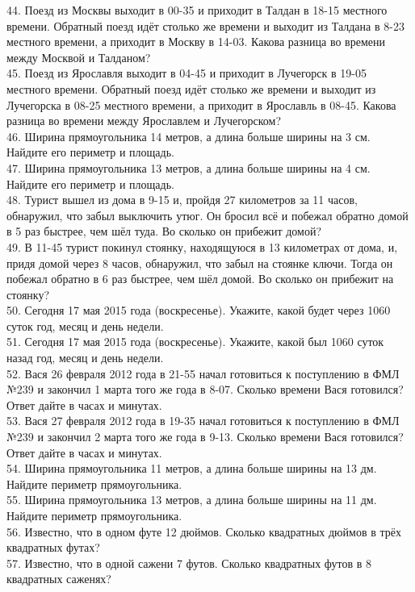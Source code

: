 \documentclass[12pt]{article}
\begin{document}
44. Поезд из Москвы выходит в 00-35 и приходит в Талдан в 18-15 местного времени. Обратный поезд идёт столько же времени и выходит из Талдана в 8-23 местного времени, а приходит в Москву в 14-03. Какова разница во времени между Москвой и Талданом?\\
45. Поезд из Ярославля выходит в 04-45 и приходит в Лучегорск в 19-05 местного времени. Обратный поезд идёт столько же времени и выходит из Лучегорска в 08-25 местного времени, а приходит в Ярославль в 08-45. Какова разница во времени между Ярославлем и Лучегорском?\\
46. Ширина прямоугольника 14 метров, а длина больше ширины на 3 см. Найдите его периметр и площадь.\\
47. Ширина прямоугольника 13 метров, а длина больше ширины на 4 см. Найдите его периметр и площадь.\\
48. Турист вышел из дома в 9-15 и, пройдя 27 километров за 11 часов, обнаружил, что забыл выключить утюг. Он бросил всё и побежал обратно домой в 5 раз быстрее, чем шёл туда. Во сколько он прибежит домой?\\
49. В 11-45 турист покинул стоянку, находящуюся в 13 километрах от дома, и, придя домой через 8 часов, обнаружил, что забыл на стоянке ключи. Тогда он побежал обратно в 6 раз быстрее, чем шёл домой. Во сколько он прибежит на стоянку?\\
50. Сегодня 17 мая 2015 года (воскресенье). Укажите, какой будет через 1060 суток год, месяц и день недели.\\
51. Сегодня 17 мая 2015 года (воскресенье). Укажите, какой был 1060 суток назад год, месяц и день недели.\\
52. Вася 26 февраля 2012 года в 21-55 начал готовиться к поступлению в ФМЛ №239 и закончил 1 марта того же года в 8-07. Сколько времени Вася готовился? Ответ дайте в часах и минутах.\\
53. Вася 27 февраля 2012 года в 19-35 начал готовиться к поступлению в ФМЛ №239 и закончил 2 марта того же года в 9-13. Сколько времени Вася готовился? Ответ дайте в часах и минутах.\\
54. Ширина прямоугольника 11 метров, а длина больше ширины на 13 дм. Найдите периметр прямоугольника.\\
55. Ширина прямоугольника 13 метров, а длина больше ширины на 11 дм. Найдите периметр прямоугольника.\\
56. Известно, что в одном футе 12 дюймов. Сколько квадратных дюймов в трёх квадратных футах?\\
57. Известно, что в одной сажени 7 футов. Сколько квадратных футов в 8 квадратных саженях?\\
\end{document}
